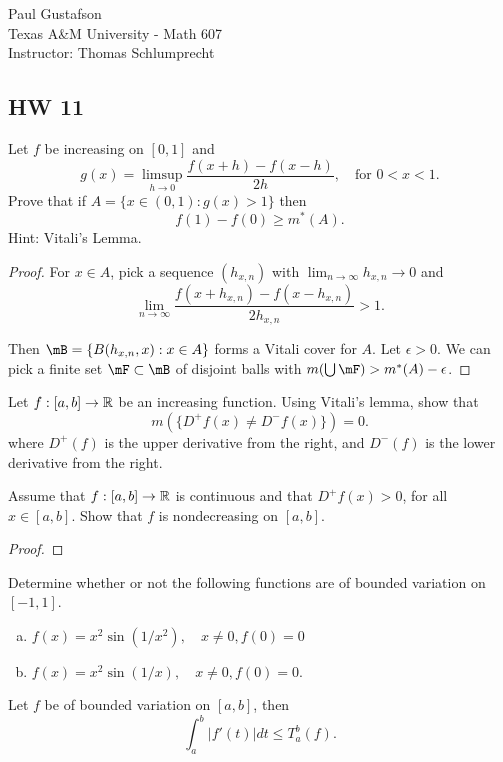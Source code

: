 \documentclass{article}
\begin{document}
\noindent Paul Gustafson\\
\noindent Texas A\&M University - Math 607\\ 
\noindent Instructor: Thomas Schlumprecht

\subsection*{HW 11} 
 Let $f$ be increasing on $[0,1]$ and 
$$
g(x) = \limsup_{h\to 0} \frac{f(x+h) - f(x-h)}{2h}, \quad 
\text{for $0 < x < 1$.}
$$
Prove that if $A = \{x \in (0,1) : g(x) > 1\}$ then
$$
f(1) -f(0) \ge m^*(A).
$$
Hint: Vitali's Lemma.

\begin{proof}
For $x \in A$, pick a sequence $(h_{x,n})$ with $\lim_{n \to \infty} h_{x,n} \to 0$ and
$$
\lim_{n \to \infty} \frac { f(x + h_{x,n}) - f(x - h_{x,n})}{2 h_{x,n}} > 1.
$$

Then $\mB = \{B(h_{x,n}, x) : x \in A\}$ forms a Vitali cover for $A$.  Let $\epsilon > 0$. 
We can pick a finite set $\mF \subset \mB$ of disjoint balls with $m(\bigcup \mF) > m^*(A) - \epsilon$.


\end{proof}


 Let $f : [a,b] \to \mathbb{R}$ be an increasing function. Using Vitali's lemma, show that 
$$
m(\{D^+f(x) \neq D^-f(x)\}) = 0.
$$
where $D^+(f)$ is the upper derivative from the right, and $D^-(f)$ is the lower derivative from the right.



 Assume that $f: [a,b] \to \mathbb{R}$ is continuous and that $D^+f(x) > 0$, for all $x \in [a,b]$.
Show that $f$ is nondecreasing on $[a,b]$.

\begin{proof}

\end{proof}



 Determine whether or not the following functions are of bounded variation on $[-1,1]$.
\begin{enumerate}[(a)]
\item $f(x) = x^2 \sin(1/x^2), \quad x \neq 0, f(0) = 0$
\item $f(x) = x^2 \sin(1/x), \quad x \neq 0, f(0) = 0.$
\end{enumerate}




 Let $f$ be of bounded variation on $[a,b]$, then 
$$
\int_a^b |f'(t)| dt \le T_a^b(f).
$$
\end{document}

